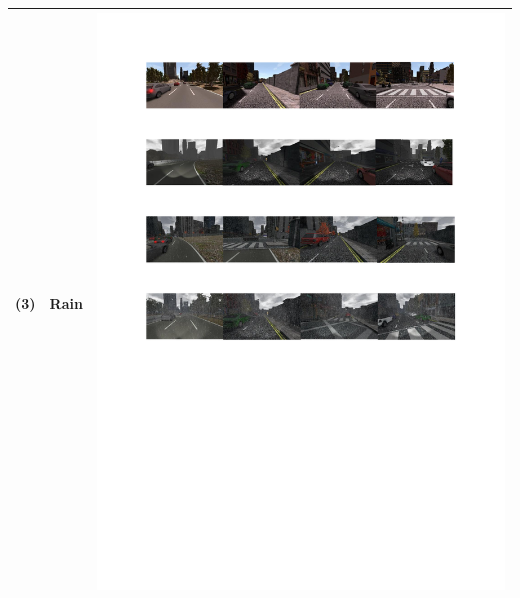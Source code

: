 \documentclass[conference]{IEEEtran}
\begin{document}
\begin{table}[!t]
\begin{tabular}{|C{1cm}|c|C{13.5cm}|}
				(3)	& Rain &  \begin{minipage}{.9\textwidth}\includegraphics[scale=.8,trim=2cm 16.5cm 2cm 10.5cm,clip]{examples.pdf}\end{minipage} \\ \hline

\end{tabular}
\end{table}
\end{document}
